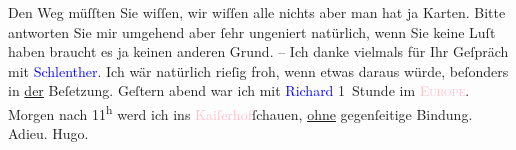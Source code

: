            \pstart
           Den Weg müſſten Sie wiſſen, wir wiſſen alle nichts aber man hat ja Karten. Bitte
                    antworten Sie mir umgehend aber ſehr ungeniert natürlich, wenn Sie keine Luſt
                    haben braucht es ja keinen anderen Grund. – Ich danke vielmals {\pb}für Ihr Geſpräch mit
                        \textcolor{blue}{Schlenther}{}\ledrightnote{\textcolor{blue}{Paul Schlenther}}. Ich wär natürlich rieſig
                    froh, wenn etwas daraus würde, beſonders in \uline{der}
                    Beſetzung.\pend
           \pstart
           Geſtern abend war ich mit \textcolor{blue}{Richard}{}\ledrightnote{\textcolor{blue}{Richard Beer-Hofmann}} 1 Stunde im
                        \textcolor{pink}{\textsc{Europe}}{}\ledrightnote{\textcolor{pink}{Café de l’Europe}}.\pend
           \pstart
           Morgen nach 11\textsuperscript{h} werd ich ins \textcolor{pink}{Kaiſerhof}{}\ledrightnote{\textcolor{pink}{Café Kaiserhof (Inh. Johann Wortner)}}{ }ſchauen,
                        \uline{ohne} gegenſeitige Bindung. Adieu.\pend
           \pstart \spacefill\mbox{Hugo.}\pend{}\endnumbering{}  
      